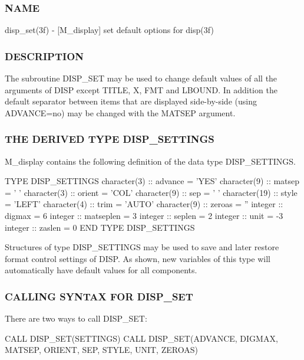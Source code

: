 \subsubsection*{N\+A\+ME}

disp\+\_\+set(3f) -\/ \mbox{[}M\+\_\+display\mbox{]} set default options for disp(3f) 

\subsubsection*{D\+E\+S\+C\+R\+I\+P\+T\+I\+ON}

The subroutine D\+I\+S\+P\+\_\+\+S\+ET may be used to change default values of all the arguments of D\+I\+SP except T\+I\+T\+LE, X, F\+MT and L\+B\+O\+U\+ND. In addition the default separator between items that are displayed side-\/by-\/side (using A\+D\+V\+A\+N\+CE=\textquotesingle{}no\textquotesingle{}) may be changed with the M\+A\+T\+S\+EP argument.

\subsubsection*{T\+HE D\+E\+R\+I\+V\+ED T\+Y\+PE D\+I\+S\+P\+\_\+\+S\+E\+T\+T\+I\+N\+GS}

M\+\_\+display contains the following definition of the data type D\+I\+S\+P\+\_\+\+S\+E\+T\+T\+I\+N\+GS. \begin{DoxyVerb}  TYPE DISP_SETTINGS
    character(3)  :: advance   = 'YES'
    character(9)  :: matsep    = '   '
    character(3)  :: orient    = 'COL'
    character(9)  :: sep       = '  '
    character(19) :: style     = 'LEFT'
    character(4)  :: trim      = 'AUTO'
    character(9)  :: zeroas    = ''
    integer       :: digmax    = 6
    integer       :: matseplen = 3
    integer       :: seplen    = 2
    integer       :: unit      = -3
    integer       :: zaslen    = 0
  END TYPE DISP_SETTINGS
\end{DoxyVerb}


Structures of type D\+I\+S\+P\+\_\+\+S\+E\+T\+T\+I\+N\+GS may be used to save and later restore format control settings of D\+I\+SP. As shown, new variables of this type will automatically have default values for all components.

\subsubsection*{C\+A\+L\+L\+I\+NG S\+Y\+N\+T\+AX F\+OR D\+I\+S\+P\+\_\+\+S\+ET}

There are two ways to call D\+I\+S\+P\+\_\+\+S\+ET\+: \begin{DoxyVerb}  CALL DISP_SET(SETTINGS)
  CALL DISP_SET(ADVANCE, DIGMAX, MATSEP, ORIENT, SEP, STYLE, UNIT, ZEROAS)
\end{DoxyVerb}


